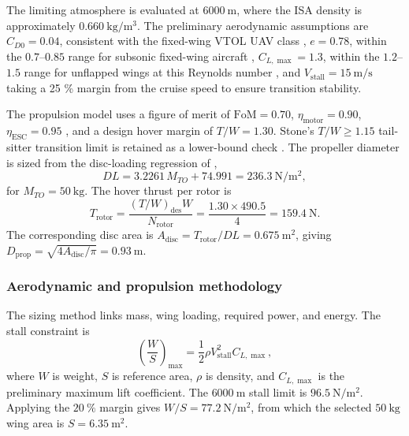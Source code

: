The limiting atmosphere is evaluated at \(6000~\mathrm{m}\), where the ISA
density is approximately \(0.660~\mathrm{kg/m^3}\). The preliminary aerodynamic
assumptions are \(C_{D0}=0.04\), consistent with the fixed-wing VTOL UAV class
\cite{Tyan2017}, \(e=0.78\), within the \(0.7\)--\(0.85\) range for subsonic
fixed-wing aircraft \cite{Raymer2018}, \(C_{L,\max}=1.3\), within the
\(1.2\)--\(1.5\) range for unflapped wings at this Reynolds number
\cite{Raymer2018}, and \(V_\mathrm{stall}=15~\mathrm{m/s}\) taking a 25 \% margin from the cruise speed to ensure transition stability. 


The propulsion model uses a figure of merit of 
\(\mathrm{FoM}=0.70\), \(\eta_\mathrm{motor}=0.90\),
\(\eta_\mathrm{ESC}=0.95\) \cite{Tyan2017}, and a design hover margin of
\(T/W=1.30\). Stone's \(T/W \geq 1.15\) tail-sitter transition limit is
retained as a lower-bound check \cite{StoneClarke2001}.
The propeller diameter is sized from the disc-loading regression of \cite{Tyan2017},
\begin{equation}
    DL = 3.2261\,M_{TO} + 74.991 = 236.3~\mathrm{N/m^2},
    \label{eq:ppa_disc_loading}
\end{equation}
for \(M_{TO}=50~\mathrm{kg}\). The hover thrust per rotor is
\begin{equation}
    T_\mathrm{rotor}
    = \frac{(T/W)_\mathrm{des}W}{N_\mathrm{rotor}}
    = \frac{1.30 \times 490.5}{4}
    = 159.4~\mathrm{N}.
    \label{eq:ppa_thrust_per_rotor}
\end{equation}
The corresponding disc area is \(A_\mathrm{disc}=T_\mathrm{rotor}/DL=0.675~\mathrm{m^2}\),
giving \(D_\mathrm{prop}=\sqrt{4A_\mathrm{disc}/\pi}=0.93~\mathrm{m}\).

 
 

  
\subsubsection{Aerodynamic and propulsion methodology}
  
The sizing method links mass, wing loading, required power, and energy. The
stall constraint \cite{Raymer2018, Ruijgrok2009} is
\begin{equation}
    \left(\frac{W}{S}\right)_{\max}
    = \frac{1}{2}\rho V_\mathrm{stall}^{2} C_{L,\max},
    \label{eq:ppa_stall_ws}
\end{equation}
where \(W\) is weight, \(S\) is reference area, \(\rho\) is density, and
\(C_{L,\max}\) is the preliminary maximum lift coefficient. The
\(6000~\mathrm{m}\) stall limit is \(96.5~\mathrm{N/m^2}\). Applying the
\(20~\%\) margin gives \(W/S=77.2~\mathrm{N/m^2}\), from which the selected
\(50~\mathrm{kg}\) wing area is \(S=6.35~\mathrm{m^2}\).
 
